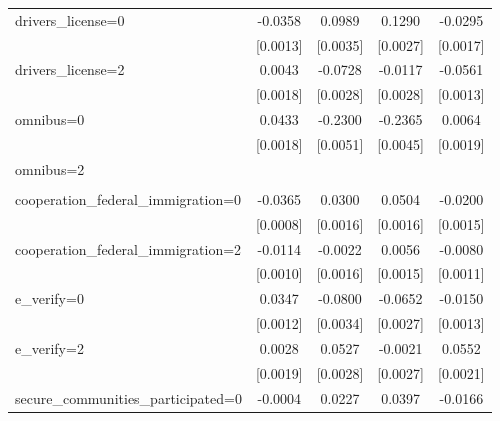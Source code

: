 \begin{table}[htbp]
\begin{tabular}{l*{4}{c}}
\addlinespace
drivers\_license=0   &     -0.0358\sym{***}&      0.0989\sym{***}&      0.1290\sym{***}&     -0.0295\sym{***}\\
                    &    [0.0013]         &    [0.0035]         &    [0.0027]         &    [0.0017]         \\
\addlinespace
drivers\_license=2   &      0.0043\sym{**} &     -0.0728\sym{***}&     -0.0117\sym{***}&     -0.0561\sym{***}\\
                    &    [0.0018]         &    [0.0028]         &    [0.0028]         &    [0.0013]         \\
\addlinespace
omnibus=0           &      0.0433\sym{***}&     -0.2300\sym{***}&     -0.2365\sym{***}&      0.0064\sym{***}\\
                    &    [0.0018]         &    [0.0051]         &    [0.0045]         &    [0.0019]         \\
\addlinespace
omnibus=2           &                     &                     &                     &                     \\
                    &                     &                     &                     &                     \\
\addlinespace
cooperation\_federal\_immigration=0&     -0.0365\sym{***}&      0.0300\sym{***}&      0.0504\sym{***}&     -0.0200\sym{***}\\
                    &    [0.0008]         &    [0.0016]         &    [0.0016]         &    [0.0015]         \\
\addlinespace
cooperation\_federal\_immigration=2&     -0.0114\sym{***}&     -0.0022         &      0.0056\sym{***}&     -0.0080\sym{***}\\
                    &    [0.0010]         &    [0.0016]         &    [0.0015]         &    [0.0011]         \\
\addlinespace
e\_verify=0          &      0.0347\sym{***}&     -0.0800\sym{***}&     -0.0652\sym{***}&     -0.0150\sym{***}\\
                    &    [0.0012]         &    [0.0034]         &    [0.0027]         &    [0.0013]         \\
\addlinespace
e\_verify=2          &      0.0028         &      0.0527\sym{***}&     -0.0021         &      0.0552\sym{***}\\
                    &    [0.0019]         &    [0.0028]         &    [0.0027]         &    [0.0021]         \\
\addlinespace
secure\_communities\_participated=0&     -0.0004         &      0.0227\sym{***}&      0.0397\sym{***}&     -0.0166\sym{***}\\

\end{tabular}
\end{table}
